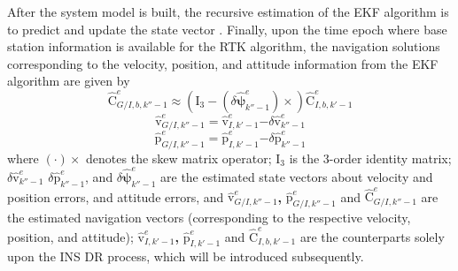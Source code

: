 \documentclass{article}
\begin{document}
After the system model is built, the recursive estimation of the EKF algorithm is to predict and update the state vector \cite{Faragher2012}. Finally, upon the time epoch where base station information is available for the RTK algorithm, the navigation solutions corresponding to the velocity, position, and attitude information from the EKF algorithm are given by
\begin{equation*}
{\hat{\boldsymbol{\mathrm{C}}}}^e_{G/I,b,k''-1}\boldsymbol{\approx }\left({\boldsymbol{\mathrm{I}}}_3-\left(\delta{\hat{\boldsymbol\psi}}^e_{k''-1}\right)\times \right){\hat{\boldsymbol{\mathrm{C}}}}^e_{I,b,k'-1}
\end{equation*}
\begin{equation*}
{\hat{\boldsymbol{\mathrm{v}}}}^e_{G/I,k''-1}={\hat{\boldsymbol{\mathrm{v}}}}^e_{I,k'-1}\boldsymbol{-}\delta {\hat{\boldsymbol{\mathrm{v}}}}^e_{k''-1}
\end{equation*}
\begin{equation*}  
{\hat{\boldsymbol{\mathrm{p}}}}^e_{G/I,k''-1}\boldsymbol{=}{\hat{\boldsymbol{\mathrm{p}}}}^e_{I,k'-1}\boldsymbol{-}\delta {\hat{\boldsymbol{\mathrm{p}}}}^e_{k''-1} 
\end{equation*} 
where $\left(\cdot \right)\times $ denotes the skew matrix operator; ${\boldsymbol{\mathrm{I}}}_3$ is the 3-order identity matrix; $\delta {\hat{\boldsymbol{\mathrm{v}}}}^e_{k''-1}$\textbf{ }$\delta {\hat{\boldsymbol{\mathrm{p}}}}^e_{k''-1}$, and $\delta\hat{\boldsymbol{\psi }}^e_{k''-1}$ are the estimated state vectors about velocity and position errors, and attitude errors, and ${\hat{\boldsymbol{\mathrm{v}}}}^e_{G/I,k''-1}$\textbf{, }${\hat{\boldsymbol{\mathrm{p}}}}^e_{G/I,k''-1}$\textbf{ }and ${\hat{\boldsymbol{\mathrm{C}}}}^e_{G/I,k''-1}$\textbf{ }are the estimated navigation vectors (corresponding to the respective velocity, position, and attitude); ${\hat{\boldsymbol{\mathrm{v}}}}^e_{I,k'-1}$\textbf{, }${\hat{\boldsymbol{\mathrm{p}}}}^e_{I,k'-1}$\textbf{ }and ${\hat{\boldsymbol{\mathrm{C}}}}^e_{I,b,k'-1}$\textbf{ }are the counterparts solely upon the INS DR process, which will be introduced subsequently. 
\end{document}
